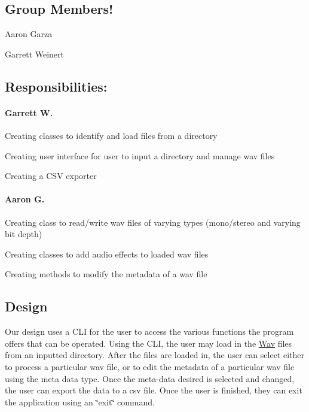 \subsection*{Group Members!}


\begin{DoxyItemize}
\item Aaron Garza
\item Garrett Weinert
\end{DoxyItemize}

\subsection*{Responsibilities\+:}

\paragraph*{Garrett W.}


\begin{DoxyItemize}
\item Creating classes to identify and load files from a directory
\item Creating user interface for user to input a directory and manage wav files
\item Creating a C\+SV exporter \paragraph*{Aaron G.}
\end{DoxyItemize}


\begin{DoxyItemize}
\item Creating class to read/write wav files of varying types (mono/stereo and varying bit depth)
\item Creating classes to add audio effects to loaded wav files
\item Creating methods to modify the metadata of a wav file
\end{DoxyItemize}

\subsection*{Design}



Our design uses a C\+LI for the user to access the various functions the program offers that can be operated. Using the C\+LI, the user may load in the \hyperlink{classWav}{Wav} files from an inputted directory. After the files are loaded in, the user can select either to process a particular wav file, or to edit the metadata of a particular wav file using the meta data type. Once the meta-\/data desired is selected and changed, the user can export the data to a csv file. Once the user is finished, they can exit the application using an \char`\"{}exit\char`\"{} command.

